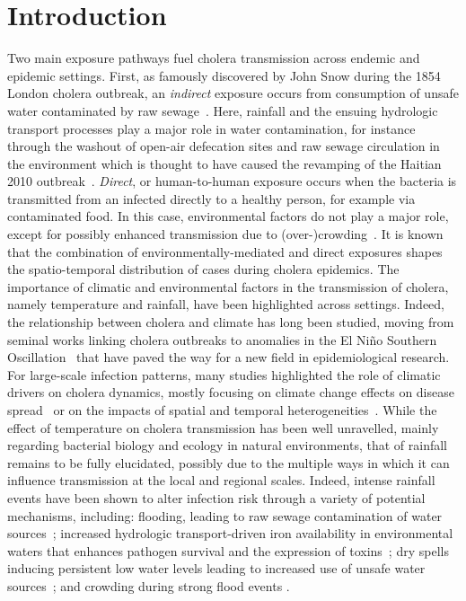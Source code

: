 \section{Introduction}
\label{sec:intro}
Two main exposure pathways fuel cholera transmission across endemic and epidemic settings.
First, as famously discovered by John Snow during the 1854 London cholera outbreak, an \textit{indirect} exposure occurs from consumption of unsafe water contaminated by raw sewage~\cite{snowModeCommunicationCholera1855}. Here, rainfall and the ensuing hydrologic transport processes play a major role in water contamination, for instance through the washout of open-air defecation sites and raw sewage circulation in the environment which is thought to have caused the revamping of the Haitian 2010 outbreak~\cite{rinaldoReassessment201020112012}. 
\textit{Direct}, or human-to-human exposure occurs when the bacteria is transmitted from an infected directly to a healthy person, for example via contaminated food. In this case, environmental factors do not play a major role, except for possibly enhanced transmission due to (over-)crowding~\cite{boeleeOptionsWaterStorage2013,fingerMobilePhoneData2016}. 
It is known that the combination of environmentally-mediated and direct exposures shapes the spatio-temporal distribution of cases during cholera epidemics\cite{sugimotoHouseholdTransmissionVibrio2014,biMicroscaleSpatialClustering2016,lesslerMeasuringSpatialDependence2016,rinaldoModelingKeyDrivers2017}.
The importance of climatic and environmental factors in the transmission of cholera, namely temperature and rainfall, have been highlighted across settings. Indeed, the relationship between cholera and climate has long been studied, moving from seminal works linking cholera outbreaks to anomalies in the El Ni\~no Southern Oscillation~\cite{colwell96,pascual00} that have paved the way for a new field in epidemiological research. For large-scale infection patterns, many studies highlighted the role of climatic drivers on cholera dynamics, mostly focusing on climate change effects on disease spread~\cite{hashizume08,demagny12,hashizume2013,rodo2013,ramirez2016,vezzulli2016,rinaldo17} or on the impacts of spatial and temporal heterogeneities~\cite{reiner12,baker-austin2013,vezzulli2013,cash2014,escobar2015,vezzulli2015,perezsaez17a}. While the effect of temperature on cholera transmission has been well unravelled, mainly regarding bacterial biology and ecology in natural environments, that of rainfall remains to be fully elucidated, possibly due to the multiple ways in which it can influence transmission at the local and regional scales\cite{rinaldoReassessment201020112012,eisenbergExaminingRainfallCholera2013,baracchiniSeasonalityCholeraDynamics2017}. Indeed, intense rainfall events have been shown to alter infection risk through a variety of potential mechanisms, including: flooding, leading to raw sewage contamination of water sources~\cite{ruiz07,hashizume08}; increased hydrologic transport-driven iron availability in environmental waters that enhances pathogen survival and the expression of toxins~\cite{lipp02,faruque2005,hill11}; dry spells inducing persistent low water levels leading to increased use of unsafe water sources~\cite{rebaudet13a}; and crowding during strong flood events \cite{reiner12}.

